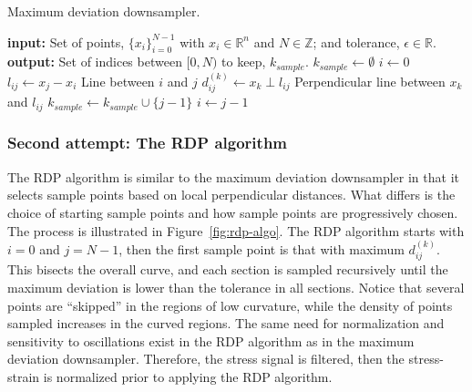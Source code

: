 \documentclass[a4paper,11pt]{article}
\begin{document}
\begin{algorithm}
	\caption{Maximum deviation downsampler.}
	\label{alg:max-dev-downsampler}
	\begin{algorithmic}[1]
		\State \textbf{input:} Set of points, $\{x_i\}_{i=0}^{N-1}$ with $x_i \in \mathbb{R}^n$ and $N \in \mathbb{Z}$; and tolerance, $\epsilon \in \mathbb{R}$.
        \State \textbf{output:} Set of indices between $[0, N)$ to keep, $k_{sample}$.
        \State $k_{sample} \gets \emptyset$
        \State $i \gets 0$
			\State $l_{ij} \gets x_j - x_i$
            \Comment Line between $i$ and $j$
                \State $d^{(k)}_{ij} \gets x_k \perp l_{ij}$
                \Comment Perpendicular line between $x_k$ and $l_{ij}$
            \EndFor
                \State $k_{sample} \gets k_{sample} \cup \{j - 1 \}$
                \State $i \gets j - 1$
            \EndIf
		\EndFor
\end{algorithmic}
\end{algorithm}

\subsubsection{Second attempt: The RDP algorithm}

The RDP algorithm is similar to the maximum deviation downsampler in that it selects sample points based on local perpendicular distances.
What differs is the choice of starting sample points and how sample points are progressively chosen.
The process is illustrated in Figure~\ref{fig:rdp-algo}.
The RDP algorithm starts with $i = 0$ and $j = N-1$, then the first sample point is that with maximum $d^{(k)}_{ij}$.
This bisects the overall curve, and each section is sampled recursively until the maximum deviation is lower than the tolerance in all sections.
Notice that several points are ``skipped'' in the regions of low curvature, while the density of points sampled increases in the curved regions.
The same need for normalization and sensitivity to oscillations exist in the RDP algorithm as in the maximum deviation downsampler.
Therefore, the stress signal is filtered, then the stress-strain is normalized prior to applying the RDP algorithm.
\end{document}
